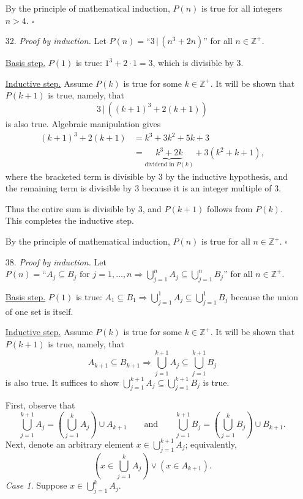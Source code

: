 \documentclass{article}
\begin{document}
\begin{enumerate}
    By the principle of mathematical induction, $P(n)$ is true for all integers $n > 4$. $\square$
    \item[32.] \textit{Proof by induction.} Let $P(n) = \text{``} 3 \,\vert\, (n^3 + 2n) \text{''}$ for all $n \in \mathbb{Z}^+$.

    \underline{Basis step.} $P(1)$ is true: $1^3 + 2 \cdot 1 = 3$, which is divisible by $3$.

    \underline{Inductive step.} Assume $P(k)$ is true for some $k \in \mathbb{Z}^+$. It will be shown that $P(k+1)$ is true, namely, that
    \[
    3 \,\vert\, ((k+1)^3 + 2(k+1))
    \]
    is also true. Algebraic manipulation gives
    \begin{align*}
    (k+1)^3 + 2(k+1) &= k^3 + 3k^2 + 5k + 3\\
    &= \underbrace{k^3 + 2k}_{\text{dividend in $P(k)$}} + 3(k^2+k+1),
    \end{align*}
    where the bracketed term is divisible by $3$ by the inductive hypothesis, and the remaining term is divisible by $3$ because it is an integer multiple of $3$.

    Thus the entire sum is divisible by $3$, and $P(k+1)$ follows from $P(k)$. This completes the inductive step.

    By the principle of mathematical induction, $P(n)$ is true for all $n \in \mathbb{Z}^+$. $\square$
    \item[38.] \textit{Proof by induction.} Let $P(n) = \text{``} A_j \subseteq B_j \text{ for } j = 1, \ldots, n \Rightarrow \displaystyle\bigcup_{j=1}^n A_j \subseteq \bigcup_{j=1}^n B_j \text{''}$ for all $n \in \mathbb{Z}^+$.

    \underline{Basis step.} $P(1)$ is true: $A_1 \subseteq B_1 \Rightarrow \bigcup_{j=1}^1 A_j \subseteq \bigcup_{j=1}^1 B_j$ because the union of one set is itself.

    \underline{Inductive step.} Assume $P(k)$ is true for some $k \in \mathbb{Z}^+$. It will be shown that $P(k+1)$ is true, namely, that
    \[
    A_{k+1} \subseteq B_{k+1} \Rightarrow \bigcup_{j=1}^{k+1} A_j \subseteq \bigcup_{j=1}^{k+1} B_j
    \]
    is also true. It suffices to show $\bigcup_{j=1}^{k+1} A_j \subseteq \bigcup_{j=1}^{k+1} B_j$ is true.

    First, observe that
    \[
    \bigcup_{j=1}^{k+1} A_j = \left( \bigcup_{j=1}^{k} A_j \right) \cup A_{k+1} \qquad\text{and}\qquad \bigcup_{j=1}^{k+1} B_j = \left( \bigcup_{j=1}^{k} B_j \right) \cup B_{k+1}.
    \]
    Next, denote an arbitrary element $x \in \bigcup_{j=1}^{k+1} A_j$; equivalently,
    \[
    \left( x \in \bigcup_{j=1}^{k} A_j \right) \lor \left( x \in A_{k+1} \right). 
    \]
    \textit{Case 1.} Suppose $x \in \bigcup_{j=1}^{k} A_j$.


\end{enumerate}
\end{document}
